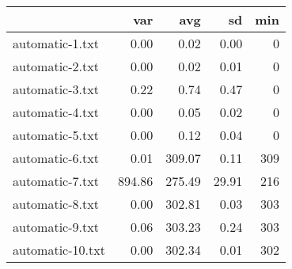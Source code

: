 \begin{tabular}{lrrrr}
  \toprule  & var & avg & sd & min \\ 
  \midrule automatic-1.txt & 0.00 & 0.02 & 0.00 & 0 \\ 
  automatic-2.txt & 0.00 & 0.02 & 0.01 & 0 \\ 
  automatic-3.txt & 0.22 & 0.74 & 0.47 & 0 \\ 
  automatic-4.txt & 0.00 & 0.05 & 0.02 & 0 \\ 
  automatic-5.txt & 0.00 & 0.12 & 0.04 & 0 \\ 
  automatic-6.txt & 0.01 & 309.07 & 0.11 & 309 \\ 
  automatic-7.txt & 894.86 & 275.49 & 29.91 & 216 \\ 
  automatic-8.txt & 0.00 & 302.81 & 0.03 & 303 \\ 
  automatic-9.txt & 0.06 & 303.23 & 0.24 & 303 \\ 
  automatic-10.txt & 0.00 & 302.34 & 0.01 & 302 \\ 
   \bottomrule \end{tabular}
